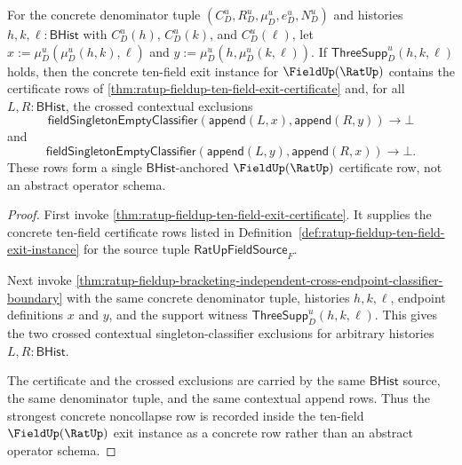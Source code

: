 \begin{theorem}
\label{thm:ratup-fieldup-ten-field-cross-endpoint-exit-certificate}
For the concrete denominator tuple $(C_D^u,R_D^u,\mu_D^u,e_D^u,N_D^u)$ and
histories $h,k,\ell:\mathsf{BHist}$ with $C_D^u(h)$, $C_D^u(k)$, and
$C_D^u(\ell)$, let $x:=\mu_D^u(\mu_D^u(h,k),\ell)$ and
$y:=\mu_D^u(h,\mu_D^u(k,\ell))$. If
$\mathsf{ThreeSupp}_D^u(h,k,\ell)$ holds, then the concrete ten-field exit
instance for $\FieldUp(\RatUp)$ contains the certificate rows of
\autoref{thm:ratup-fieldup-ten-field-exit-certificate} and, for all
$L,R:\mathsf{BHist}$, the crossed contextual exclusions
$$
\mathsf{fieldSingletonEmptyClassifier}(\mathsf{append}(L,x),\mathsf{append}(R,y))
\to\bot
$$
and
$$
\mathsf{fieldSingletonEmptyClassifier}(\mathsf{append}(L,y),\mathsf{append}(R,x))
\to\bot.
$$
These rows form a single $\mathsf{BHist}$-anchored
$\FieldUp(\RatUp)$ certificate row, not an abstract operator schema.
\end{theorem}
\begin{proof}
First invoke \autoref{thm:ratup-fieldup-ten-field-exit-certificate}. It
supplies the concrete ten-field certificate rows listed in
Definition~\ref{def:ratup-fieldup-ten-field-exit-instance} for the source tuple
$\mathsf{RatUpFieldSource}_F$.

Next invoke
\autoref{thm:ratup-fieldup-bracketing-independent-cross-endpoint-classifier-boundary}
with the same concrete denominator tuple, histories $h,k,\ell$, endpoint
definitions $x$ and $y$, and the support witness
$\mathsf{ThreeSupp}_D^u(h,k,\ell)$. This gives the two crossed contextual
singleton-classifier exclusions for arbitrary histories $L,R:\mathsf{BHist}$.

The certificate and the crossed exclusions are carried by the same
$\mathsf{BHist}$ source, the same denominator tuple, and the same contextual
append rows. Thus the strongest concrete noncollapse row is recorded inside
the ten-field $\FieldUp(\RatUp)$ exit instance as a concrete row rather than an
abstract operator schema.
\end{proof}

